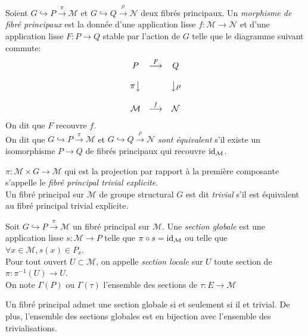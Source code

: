 \documentclass[12pt, a4paper]{book}
\begin{document}
\begin{defi}
Soient $G \hookrightarrow P \overset{\pi}{\to} \mathcal{M}$ et $G \hookrightarrow Q \overset{\rho}{\to} \mathcal{N}$ deux fibrés principaux. Un \emph{morphisme de fibré principaux} est la donnée d'une application lisse $f:\mathcal{M}\to \mathcal{N}$ et d'une application lisse $F: P \to Q$ stable par l'action de $G$ telle que le diagramme suivant commute:
$$\begin{matrix}
P  & \overset{F}{\longrightarrow} & Q \\ \\
\pi\big\downarrow &  & \big\downarrow\rho \\ \\
\mathcal{M} & \overset{f}{\longrightarrow} & \mathcal{N} 
\end{matrix}
$$
On dit que $F$ recouvre $f$. \\

On dit que $G \hookrightarrow P \overset{\pi}{\to} \mathcal{M}$ et $G \hookrightarrow Q \overset{\rho}{\to} \mathcal{N}$ \emph{sont équivalent} s'il existe un isomorphisme $P\to Q$ de fibrés principaux qui recouvre $\operatorname{id}_\mathcal{M}$.
\end{defi}

\begin{defi}
$\pi : \mathcal{M}\times G \to \mathcal{M}$ qui est la projection par rapport à la première composante s'appelle le \emph{fibré principal trivial explicite}. \\
Un fibré principal sur $\mathcal{M}$ de groupe structural $G$ est dit \emph{trivial} s'il est équivalent au fibré principal trivial explicite. 
\end{defi}

\begin{defi}
Soit $G \hookrightarrow P \overset{\pi}{\to} \mathcal{M}$ un fibré principal sur $\mathcal{M}$. Une \emph{section globale} est une application lisse $s:\mathcal{M} \to P$ telle que $\pi \circ s = \operatorname{id}_\mathcal{M}$ ou telle que $\forall x\in \mathcal{M}, s(x) \in P_x$. \\
Pour tout ouvert $U\subset \mathcal{M}$, on appelle \emph{section locale} sur $U$ toute section de $\pi : \pi^{-1}(U) \to U$. \\
On note $\Gamma(P)$ ou $\Gamma(\tau)$ l'ensemble des sections de $\tau: E \to \mathcal{M}$
\end{defi}

\begin{pro}
Un fibré principal admet une section globale si et seulement si il et trivial. De plus, l'ensemble des sections globales est en bijection avec l'ensemble des trivialisations.
\end{pro}
\end{document}
